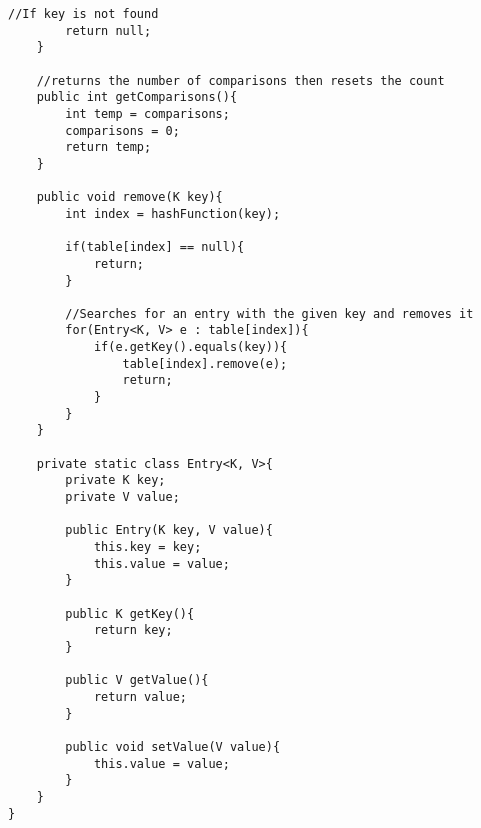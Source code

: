 \documentclass[10pt]{article}
\begin{document}
\begin{lstlisting}[frame=single, ]
        //If key is not found
        return null;
    }

    //returns the number of comparisons then resets the count
    public int getComparisons(){
        int temp = comparisons;
        comparisons = 0;
        return temp;
    }
    
    public void remove(K key){
        int index = hashFunction(key);
        
        if(table[index] == null){
            return;
        }
        
        //Searches for an entry with the given key and removes it
        for(Entry<K, V> e : table[index]){
            if(e.getKey().equals(key)){
                table[index].remove(e);
                return;
            }
        }
    }
    
    private static class Entry<K, V>{
        private K key;
        private V value;
        
        public Entry(K key, V value){
            this.key = key;
            this.value = value;
        }
        
        public K getKey(){
            return key;
        }
        
        public V getValue(){
            return value;
        }
        
        public void setValue(V value){
            this.value = value;
        }
    }
}
\end{lstlisting}
\end{document}
